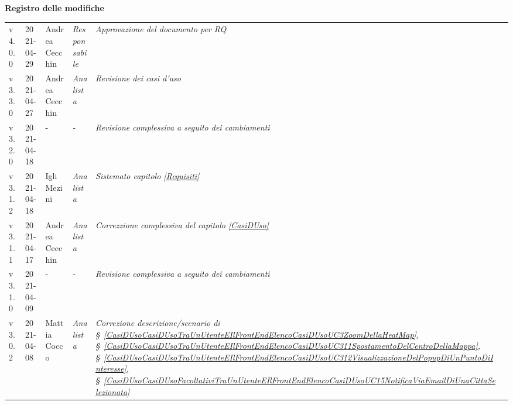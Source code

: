 \quad
\begin{center}
	\LARGE\textbf{Registro delle modifiche}
\end{center}
\def\tabularxcolumn#1{m{#1}}
{

\begin{center}
	\renewcommand{\arraystretch}{1.4}
	\begin{longtable}[c]{|p{2cm-1\tabcolsep}|p{2cm}|p{3cm-2\tabcolsep}|p{}|p{}|p{3cm}|}
		\hline
		\rowcolor{airforceblue}
		\makecell[c]{\textbf{Versione}} & \makecell[c]{\textbf{Data}} & \makecell[c]{\textbf{Autore}} & \makecell[c]{\textbf{Ruolo}} & \makecell[c]{\textbf{Modifica}} & \makecell[c]{\textbf{Verificatore}} \\
		\hline
		\centering v4.0.0 & 2021-04-29 & Andrea Cecchin & \centering \textit{Responsabile} & \textit{Approvazione del documento per RQ} & \makecell[c]{-}\\
		\hline
		\centering v3.3.0 & 2021-04-27 & Andrea Cecchin & \centering \textit{Analista} & \textit{Revisione dei casi d'uso} & \makecell[c]{Andrea Dorigo}\\
		\hline
		\centering v3.2.0 & 2021-04-18 & \centering - & \centering \textit{-} & \textit{Revisione complessiva a seguito dei cambiamenti} & \makecell[c]{Emma Roveroni}\\
		\hline
		\centering v3.1.2 & 2021-04-18 & Igli Mezini & \centering \textit{Analista} & \textit{Sistemato capitolo \ref{Requisiti}} & \makecell[c]{Alfredo Graziano}\\
		\hline
		\centering v3.1.1 & 2021-04-17 & Andrea Cecchin & \centering \textit{Analista} & \textit{Correzzione complessiva del capitolo \ref{CasiDUso}} & \makecell[c]{Alfredo Graziano}\\
		\hline
		\centering v3.1.0 & 2021-04-09 & \centering - & \centering \textit{-} & \textit{Revisione complessiva a seguito dei cambiamenti} & \makecell[c]{Andrea Cecchin}\\
		\hline
		\centering v3.0.2 & 2021-04-08 & Mattia Cocco & \centering \textit{Analista} & \textit{Correzione descrizione/scenario di \S~\ref{CasiDUsoCasiDUsoTraUnUtenteEIlFrontEndElencoCasiDUsoUC3ZoomDellaHeatMap}, \S~\ref{CasiDUsoCasiDUsoTraUnUtenteEIlFrontEndElencoCasiDUsoUC311SpostamentoDelCentroDellaMappa}, \S~\ref{CasiDUsoCasiDUsoTraUnUtenteEIlFrontEndElencoCasiDUsoUC312VisualizzazioneDelPopupDiUnPuntoDiInteresse}, \S~\ref{CasiDUsoCasiDUsoFacoltativiTraUnUtenteEIlFrontEndElencoCasiDUsoUC15NotificaViaEmailDiUnaCittaSelezionata}} &  \makecell[c]{Andrea Cecchin} \\

\end{longtable}
\end{center}}

